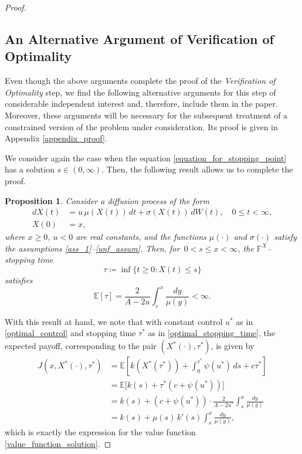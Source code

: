 \documentclass[11pt,tbtags,reqno]{article}
\newtheorem{Prop}[Th]{Proposition}
\theoremstyle{definition}
\numberwithin{equation}{section}
\theoremstyle{definition}
\begin{document}
\begin{proof}
\subsection{An Alternative Argument of Verification of Optimality}

Even though the above arguments complete the proof of the \textit{Verification of Optimality} step, we find the following alternative arguments for this step of considerable independent interest and, therefore, include them in the paper. Moreover, these arguments will be necessary for the subsequent treatment of a constrained version of the problem under consideration. Its proof is given in Appendix \ref{appendix_proof}.

We consider again the case when the equation \eqref{equation_for_stopping_point} has a solution $s \in (0, \infty)$. Then, the following result allows us to complete the proof.
\begin{Prop}\label{stopping_time_expectation}
    Consider a diffusion process of the form
    \begin{equation}\label{proposition_diffusion}
        \begin{split}
        dX(t) &= u\, \mu(X(t)) \,dt + 
        \sigma (X(t)) \,
        dW(t), \quad 0 \le t < \infty,\\
        X(0) &= x,
    \end{split}
    \end{equation}
    where $x \ge 0$, $u < 0$ are real constants, and the functions $\mu(\cdot)$ and $\sigma(\cdot)$ satisfy the assumptions \ref{ass_1}--\ref{unf_assum}. Then, for $\, 0 < s \le x < \infty$, the $\mathbb{F}^X$--stopping time
    \begin{equation}\label{one_sided_hitting_time}
        \tau \coloneqq \inf\{t \ge 0 : X(t) \le s \}
    \end{equation}
    satisfies \begin{equation}\label{stop_time_expectation_formula}
        \mathbb{E}[\tau] = \frac{2}{A - 2u}\int_s^x \frac{dy}{\mu(y)} < \infty.
    \end{equation}
\end{Prop}
With this result at hand, we note that with constant control $u^*$ as in \eqref{optimal_control} and stopping time $\tau^*$ as in \eqref{optimal_stopping_time}, the expected payoff, corresponding to the pair $(X^*(\cdot), \tau^*)$, is given by 
\begin{equation}\label{chain_for_J}
    \begin{split}
        J(x, X^*(\cdot), \tau^*) 
        &=
        \mathbb{E}\left[ k(X^*(\tau^*)) + \int_0^{\tau^*} \psi(u^*) \, ds + c\tau^* \right] 
        \\ &= 
        \mathbb{E}\Big[ k(s) + \tau^*(c + \psi(u^*)) \Big]
        \\ &=
        k(s) + (c + \psi(u^*)) \cdot \frac{2}{A - 2u^*}\int_s^x \frac{dy}{\mu(y)} 
        \\ &=
        k(s) + \mu(s) \, k'(s) \int_s^x \frac{dy}{\mu(y)},
    \end{split}
\end{equation}
which is exactly the expression for the value function \eqref{value_function_solution}. 


\end{proof}
\end{document}
